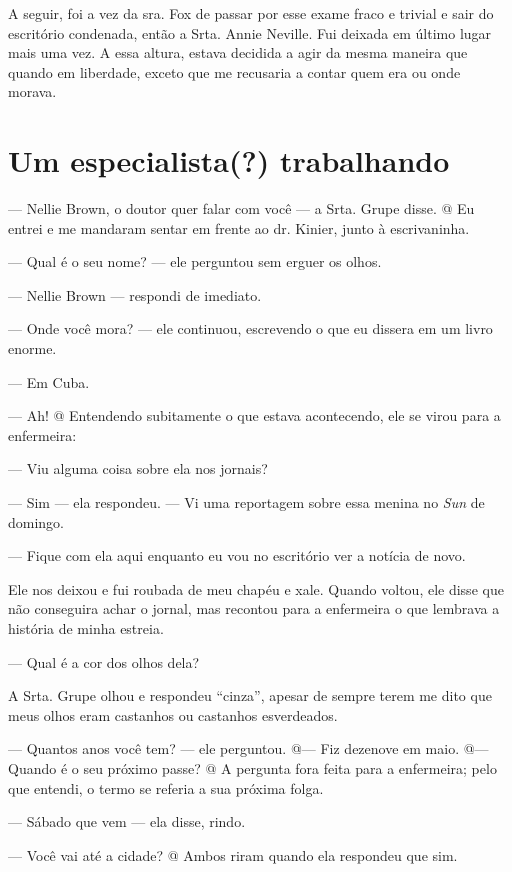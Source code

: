 A
seguir, foi a vez da sra. Fox de passar por esse exame fraco e trivial e
sair do escritório condenada, então a Srta. Annie Neville. Fui deixada
em último lugar mais uma vez. A essa altura, estava decidida a agir da
mesma maneira que quando em liberdade, exceto que me recusaria a contar
quem era ou onde morava.

\label{section-5}

\chapter{Um especialista(?)
trabalhando}\label{capuxedtulo-ix-um-especialista-trabalhando}

--- Nellie Brown, o doutor quer falar com você --- a Srta. Grupe disse.
@ Eu entrei e me mandaram sentar em frente ao dr. Kinier, junto à
escrivaninha.

--- Qual é o seu nome? --- ele perguntou sem erguer os olhos.

--- Nellie Brown --- respondi de imediato.

--- Onde você mora? --- ele continuou, escrevendo o que eu dissera em um
livro enorme.

--- Em Cuba.

--- Ah! @ Entendendo subitamente o que estava acontecendo, ele se virou
para a enfermeira:

--- Viu alguma coisa sobre ela nos jornais?

--- Sim --- ela respondeu. --- Vi uma reportagem sobre essa menina no
\emph{Sun} de domingo.

--- Fique com ela aqui enquanto eu vou no escritório ver a notícia de
novo.

Ele nos deixou e fui roubada de meu chapéu e xale. Quando voltou, ele
disse que não conseguira achar o jornal, mas recontou para a enfermeira
o que lembrava a história de minha estreia.

--- Qual é a cor dos olhos dela?

A Srta. Grupe olhou e respondeu ``cinza'', apesar de sempre terem me
dito que meus olhos eram castanhos ou castanhos esverdeados.

--- Quantos anos você tem? --- ele perguntou. @--- Fiz dezenove em maio.
@--- Quando é o seu próximo passe? @ A pergunta fora feita para a
enfermeira; pelo que entendi, o termo se referia a sua próxima folga.

--- Sábado que vem --- ela disse, rindo.

--- Você vai até a cidade? @ Ambos riram quando ela respondeu que sim.

